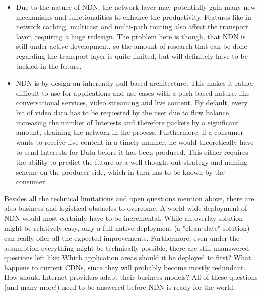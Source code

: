 \begin{itemize}
	\item Due to the nature of NDN, the network layer may potentially gain many new mechanisms and functionalities to enhance the productivity. Features like in-network caching, multicast and multi-path routing also affect the transport layer, requiring a huge redesign. The problem here is though, that NDN is still under active development, so the amount of research that can be done regarding the transport layer is quite limited, but will definitely have to be tackled in the future.
	
	\item NDN is by design an inherently pull-based architecture. This makes it rather difficult to use for applications and use cases with a push based nature, like conversational services, video streaming and live content. By default, every bit of video data has to be requested by the user due to flow balance, increasing the number of Interests and therefore packets by a significant amount, straining the network in the process. Furthermore, if a consumer wants to receive live content in a timely manner, he would theoretically have to send Interests for Data before it has been produced. This either requires the ability to predict the future or a well thought out strategy and naming scheme on the producer side, which in turn has to be known by the consumer.

	

\end{itemize}

Besides all the technical limitations and open questions mention above, there are also business and logistical obstacles to overcome. A world wide deployment of NDN would most certainly have to be incremental. While an overlay solution might be relatively easy, only a full native deployment (a "clean-slate" solution) can really offer all the expected improvements. Furthermore, even under the assumption everything might be technically possible, there are still unanswered questions left like: Which application areas should it be deployed to first? What happens to current CDNs, since they will probably become mostly redundant. How should Internet providers adapt their business models? All of these questions (and many more!) need to be answered before NDN is ready for the world. 
\cite{XVSF+13}


